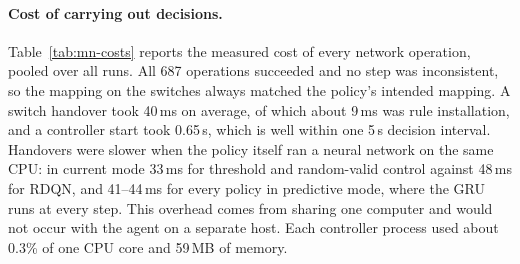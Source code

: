 \begin{table}[htbp]
\centering
\caption{Noise robustness: range of reward over eight replays per window with Gaussian load noise ($\sigma=0.001$). Spread is maximum minus minimum.}
\label{tab:mn-noise}
\small
{}
\end{table}

\paragraph{Cost of carrying out decisions.} Table~\ref{tab:mn-costs} reports the measured cost of every network operation, pooled over all runs. All 687 operations succeeded and no step was inconsistent, so the mapping on the switches always matched the policy's intended mapping. A switch handover took 40\,ms on average, of which about 9\,ms was rule installation, and a controller start took 0.65\,s, which is well within one 5\,s decision interval. Handovers were slower when the policy itself ran a neural network on the same CPU: in current mode 33\,ms for threshold and random-valid control against 48\,ms for RDQN, and 41--44\,ms for every policy in predictive mode, where the GRU runs at every step. This overhead comes from sharing one computer and would not occur with the agent on a separate host. Each controller process used about 0.3\% of one CPU core and 59\,MB of memory.

